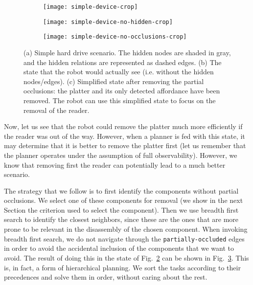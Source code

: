 \documentclass[../root.tex]{subfiles}
\begin{document}
\begin{figure}[tbhp]
	\centering
	\begin{subfigure}[b]{0.77\columnwidth}
		\texttt{[image: simple-device-crop]}
		\caption{}
		\label{fig:simple-device}
	\end{subfigure}

	\vspace{0.5cm}

	\begin{subfigure}[b]{0.75\columnwidth}
		\texttt{[image: simple-device-no-hidden-crop]}
		\caption{}
		\label{fig:simple-device-no-hidden}
	\end{subfigure}

	\vspace{0.5cm}

	\begin{subfigure}[b]{0.60\columnwidth}
		\texttt{[image: simple-device-no-occlusions-crop]}
		\caption{}
		\label{fig:simple-device-no-occlusions}
	\end{subfigure}
	\caption{
		(a) Simple hard drive scenario. The hidden nodes are shaded in gray,
			and the hidden relations are represented as dashed edges.
		(b) The state that the robot would actually see (i.e. without the
			hidden nodes/edges).
        (c) Simplified state after removing the partial occlusions: the platter
			and its only detected affordance have been removed. The robot can
			use this simplified state to focus on the removal of the reader.
	}
	\label{fig:device}
\end{figure}

Now, let us see that the robot could remove the platter much more efficiently if the reader
was out of the way. However, when a planner is fed with this state, it may determine that
it is better to remove the platter first (let us remember that the planner operates under
the assumption of full observability). However, we know that removing first the reader can
potentially lead to a much better scenario.

The strategy that we follow is to first identify the components without partial occlusions.
We select one of these components for removal (we show in the next Section the criterion
used to select the component). Then
we use breadth first search to identify the closest neighbors, since these are the ones that
are more prone to be relevant in the disassembly of the chosen component. When invoking
breadth first search, we do not navigate through the \texttt{partially-occluded} edges in order
to avoid the accidental inclusion of the components that we want to avoid. The result
of doing this in the state of Fig.~\ref{fig:simple-device-no-hidden} can be shown in
Fig.~\ref{fig:simple-device-no-occlusions}. This is, in fact, a form of hierarchical planning.
We sort the tasks according to their
precedences and solve them in order, without caring about the rest.
\end{document}
